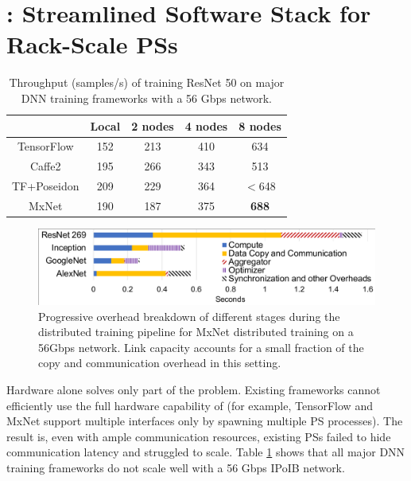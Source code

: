 \section{\phub: Streamlined Software Stack for Rack-Scale PSs}

\begin{table}[tb!]
        \centering
        \footnotesize
	\begin{tabular}{|c|c|c|c|c|}
		\hline
		   & Local & 2 nodes & 4 nodes & 8 nodes\\
		\hline 
		TensorFlow   & 152  &  213  & 410    &  634 \\
		\hline
		Caffe2 & 195   &  266  &  343   &   513  \\
		\hline
		TF+Poseidon\cite{poseidon} & 209 & 229  & 364 & $<$648 \\
		\hline
		MxNet & 190  &  187  &  375   &  \textbf{688}  \\
		\hline
	\end{tabular}
	\caption{Throughput (samples/s) of training ResNet 50 on  major DNN training frameworks with a 56 Gbps network.}
	\label{table:frameworkPerf}
\end{table}

\begin{figure}
    \centering
	\includegraphics[width=.7\linewidth,trim=3 2 2 4,clip]{Figures/OverheadBreakdown.pdf}
	\caption{Progressive overhead breakdown of different stages during the distributed training pipeline for MxNet distributed training on a 56Gbps network. Link capacity accounts for a small fraction of the copy and communication overhead in this setting.}
	\label{fig:overheadBreakdown}
\end{figure}

Hardware alone solves only part of the problem. Existing frameworks cannot efficiently use the full hardware capability of \pbox (for example, TensorFlow and MxNet support multiple interfaces only by spawning multiple PS processes). The result is, even with ample communication resources, existing PSs failed to hide communication latency and struggled to scale. Table \ref{table:frameworkPerf} shows that all major DNN training frameworks %
do not scale well with a 56 Gbps IPoIB network.

